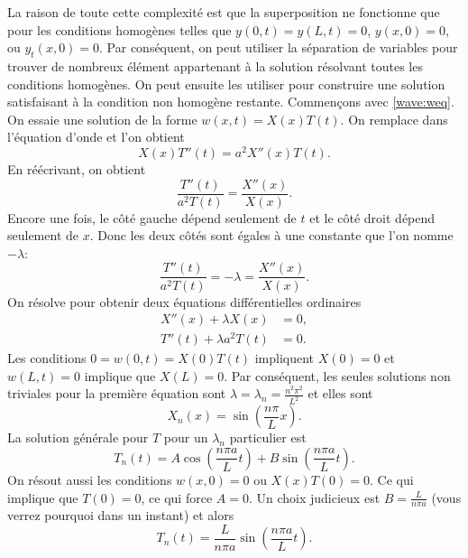 La raison de toute cette complexité est que la superposition ne fonctionne que pour les
conditions homogènes telles que
$y(0,t) = y(L,t) = 0$, $y(x,0) = 0$,  ou $y_t(x,0) = 0$.  Par conséquent,
on peut utiliser la séparation de variables pour trouver de nombreux élément appartenant à la
solution résolvant toutes les conditions homogènes.  On peut  ensuite les utiliser pour
construire une solution satisfaisant à la condition non homogène restante.
Commençons avec  \eqref{wave:weq}.
On essaie une solution de la forme $w(x,t) = X(x) T(t)$.  On remplace dans l'équation d'onde et l'on obtient 
\begin{equation*}
X(x)T''(t) = a^2 X''(x) T(t) .
\end{equation*}
En réécrivant,  on obtient 
\begin{equation*}
\frac{T''(t)}{a^2 T(t)} = \frac{X''(x)}{X(x)} .
\end{equation*}
Encore une fois, le côté gauche dépend seulement de $ t $ et le côté droit dépend
seulement de $ x $.  Donc les deux côtés sont égales à une constante que l'on nomme
$-\lambda$:
\begin{equation*}
\frac{T''(t)}{a^2 T(t)} = -\lambda = \frac{X''(x)}{X(x)} .
\end{equation*}
On résolve pour obtenir deux équations différentielles ordinaires
\begin{align*}
X''(x) + \lambda X(x) &= 0 , \\
T''(t) + \lambda a^2 T(t) &= 0 .
\end{align*}
Les conditions $0 = w(0,t) = X(0) T(t)$ impliquent $X(0) = 0$ et
$w(L,t) = 0$ implique que $X(L) = 0$.  Par conséquent,  les seules solutions non triviales
 pour la première équation sont 
$\lambda = \lambda_n = \frac{n^2 \pi^2}{L^2}$ et elles sont
\begin{equation*}
X_n(x) = \sin \left( \frac{n \pi}{L} x \right) .
\end{equation*}
La solution générale pour $T$ pour un $\lambda_n$ particulier est  
\begin{equation*}
T_n(t) = A \cos \left( \frac{n \pi a}{L} t \right)
+ B \sin \left( \frac{n \pi a}{L} t \right).
\end{equation*}
On résout aussi les conditions $w(x,0) = 0$ ou $X(x)T(0) = 0$.  Ce qui implique que $T(0) = 0$,  ce qui force $A = 0$.  Un choix judicieux est $B=\frac{L}{n \pi a}$ (vous verrez pourquoi dans un instant)
et alors
\begin{equation*}
T_n(t) = \frac{L}{n \pi a} \sin \left( \frac{n \pi a}{L} t \right).
\end{equation*}
